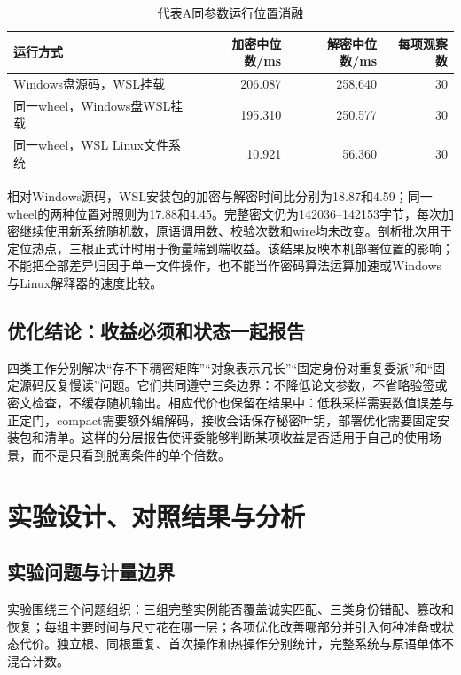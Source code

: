 \documentclass[UTF8,a4paper,12pt,oneside,openany,fontset=fandol]{ctexrep}
\begin{document}
\begin{table}[htbp]
\centering
\small
\caption{代表A同参数运行位置消融}
\label{tab:placement-ablation}
\begin{tabularx}{\textwidth}{@{}>{\raggedright\arraybackslash}Xrrr@{}}
\toprule
\rowcolor{black!8} 运行方式 & 加密中位数/ms & 解密中位数/ms & 每项观察数 \\
\midrule
Windows盘源码，WSL挂载 & 206.087 & 258.640 & 30 \\
同一wheel，Windows盘WSL挂载 & 195.310 & 250.577 & 30 \\
同一wheel，WSL Linux文件系统 & 10.921 & 56.360 & 30 \\
\bottomrule
\end{tabularx}
\end{table}

相对Windows源码，WSL安装包的加密与解密时间比分别为18.87和4.59；同一wheel的两种位置对照则为17.88和4.45。完整密文仍为142036--142153字节，每次加密继续使用新系统随机数，原语调用数、校验次数和wire均未改变。剖析批次用于定位热点，三根正式计时用于衡量端到端收益。该结果反映本机部署位置的影响；不能把全部差异归因于单一文件操作，也不能当作密码算法运算加速或Windows与Linux解释器的速度比较。

\section{优化结论：收益必须和状态一起报告}
四类工作分别解决“存不下稠密矩阵”“对象表示冗长”“固定身份对重复委派”和“固定源码反复慢读”问题。它们共同遵守三条边界：不降低论文参数，不省略验签或密文检查，不缓存随机输出。相应代价也保留在结果中：低秩采样需要数值误差与正定门，compact需要额外编解码，接收会话保存秘密叶钥，部署优化需要固定安装包和清单。这样的分层报告使评委能够判断某项收益是否适用于自己的使用场景，而不是只看到脱离条件的单个倍数。

\chapter{实验设计、对照结果与分析}

\section{实验问题与计量边界}
实验围绕三个问题组织：三组完整实例能否覆盖诚实匹配、三类身份错配、篡改和恢复；每组主要时间与尺寸花在哪一层；各项优化改善哪部分并引入何种准备或状态代价。独立根、同根重复、首次操作和热操作分别统计，完整系统与原语单体不混合计数。
\end{document}
